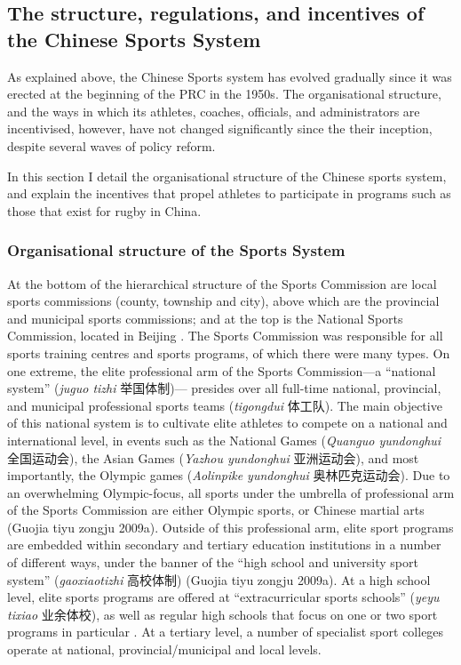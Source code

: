 \begin{CJK}{UTF8}{gbsn}
\section{The structure, regulations, and incentives of the Chinese Sports System}
As explained above, the Chinese Sports system has evolved gradually since it was erected at the beginning of the PRC in the 1950s. The organisational structure, and the ways in which its athletes, coaches, officials, and administrators are incentivised, however, have not changed significantly since the their inception, despite several waves of policy reform.





In this section I detail the organisational structure of the Chinese sports system, and explain the incentives that propel athletes to participate in programs such as those that exist for rugby in China.

\subsubsection{Organisational structure of the Sports System}
At the bottom of the hierarchical structure of the Sports Commission are local sports commissions (county, township and city), above which are the provincial and municipal sports commissions; and at the top is the National Sports Commission, located in Beijing \citep[59]{Brownell1995}.  The Sports Commission was responsible for all sports training centres and sports programs, of which there were many types.  On one extreme, the elite professional arm of the Sports Commission---a ``national system'' (\textit{juguo tizhi} 举国体制)--- presides over all full-time national, provincial, and municipal professional sports teams (\textit{tigongdui} 体工队).  The main objective of this national system is to cultivate elite athletes to compete on a national and international level, in events such as the National Games (\textit{Quanguo yundonghui} 全国运动会), the Asian Games (\textit{Yazhou yundonghui} 亚洲运动会), and most importantly, the Olympic games (\textit{Aolinpike yundonghui} 奥林匹克运动会).  Due to an overwhelming Olympic-focus, all sports under the umbrella of professional arm of the Sports Commission are either Olympic sports, or Chinese martial arts (Guojia tiyu zongju 2009a).  Outside of this professional arm, elite sport programs are embedded within secondary and tertiary education institutions in a number of different ways, under the banner of the ``high school and university sport system'' (\textit{gaoxiaotizhi} 高校体制) (Guojia tiyu zongju 2009a).  At a high school level, elite sports programs are offered at ``extracurricular sports schools'' (\textit{yeyu tixiao} 业余体校), as well as regular high schools that focus on one or two sport programs in particular \citep[59]{Brownell1995}. At a tertiary level, a number of specialist sport colleges operate at national, provincial/municipal and local levels.


\end{CJK}
